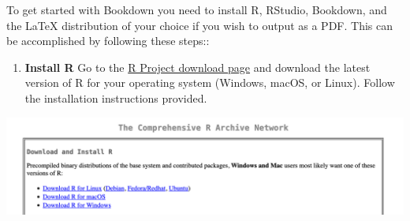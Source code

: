 \documentclass[
]{book}
\providecommand{\tightlist}{%
  \setlength{\itemsep}{0pt}\setlength{\parskip}{0pt}}
\theoremstyle{definition}
\theoremstyle{definition}
\theoremstyle{definition}
\theoremstyle{definition}
\theoremstyle{remark}
\begin{document}
To get started with Bookdown you need to install R, RStudio, Bookdown, and the LaTeX distribution of your choice if you wish to output as a PDF. This can be accomplished by following these steps::

\begin{enumerate}
\def\labelenumi{\arabic{enumi}.}
\tightlist
\item
  \textbf{Install R}
  Go to the \href{https://cran.r-project.org/}{R Project download page} and download the latest version of R for your operating system (Windows, macOS, or Linux). Follow the installation instructions provided.
\end{enumerate}

\includegraphics[width=27.33in]{images/tutorialscreenshots/installR}
\end{document}
